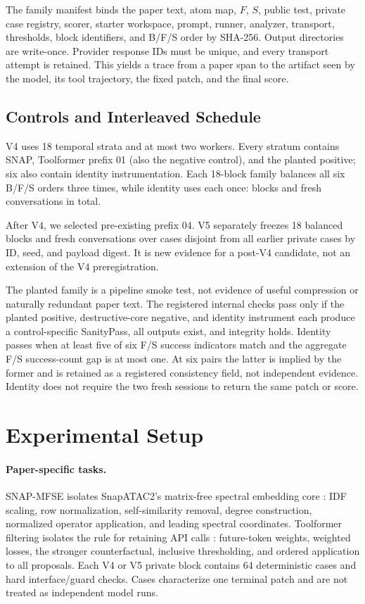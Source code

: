 \documentclass[letterpaper]{article} %
\begin{document}
The family manifest binds the paper text, atom map, $F$, $S$, public test,
private case registry, scorer, starter workspace, prompt, runner, analyzer,
transport, thresholds, block identifiers, and B/F/S order by SHA-256.  Output
directories are write-once.  Provider response IDs must be unique, and every
transport attempt is retained.  This yields a trace from a paper span to the
artifact seen by the model, its tool trajectory, the fixed patch, and the final
score.

\subsection{Controls and Interleaved Schedule}

V4 uses 18 temporal strata and at most two workers.  Every stratum contains SNAP,
Toolformer prefix 01 (also the negative control), and the planted positive; six
also contain identity instrumentation.  Each 18-block family balances all six
B/F/S orders three times, while identity uses each once: \VFourRegisteredBlocks{}
blocks and \VFourProviderConversations{} fresh conversations in total.

After V4, we selected pre-existing prefix 04.  V5 separately freezes 18 balanced
blocks and \VFiveProviderConversations{} fresh conversations over cases disjoint
from all earlier private cases by ID, seed, and payload digest.  It is new evidence
for a post-V4 candidate, not an extension of the V4 preregistration.

The planted family is a pipeline smoke test, not evidence of useful compression
or naturally redundant paper text.  The registered internal checks pass only if
the planted positive, destructive-core negative, and identity instrument each
produce a control-specific SanityPass, all outputs exist, and integrity
holds.  Identity passes when at least five of six F/S success indicators match
and the aggregate F/S success-count gap is at most one.  At six pairs the latter
is implied by the former and is retained as a registered consistency field, not
independent evidence.  Identity does not require
the two fresh sessions to return the same patch or score.

\section{Experimental Setup}

\paragraph{Paper-specific tasks.}
SNAP-MFSE isolates SnapATAC2's matrix-free spectral embedding core
\cite{zhang2024snapatac2}: IDF scaling, row normalization, self-similarity
removal, degree construction, normalized operator application, and leading
spectral coordinates.  Toolformer filtering isolates the rule for retaining API
calls \cite{schick2023toolformer}: future-token weights, weighted losses, the
stronger counterfactual, inclusive thresholding, and ordered application to all
proposals.  Each V4 or V5 private block contains 64 deterministic cases and hard
interface/guard checks.  Cases characterize one terminal patch and are not
treated as independent model runs.
\end{document}

